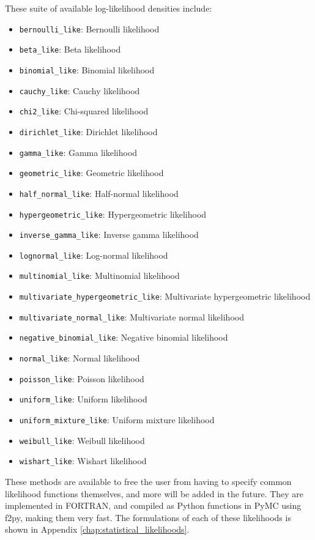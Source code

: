 \documentclass[]{book}
\begin{document}
These suite of available log-likelihood densities include:
\begin{itemize}

\item \verb=bernoulli_like=: Bernoulli likelihood
\item \verb=beta_like=: Beta likelihood
\item \verb=binomial_like=: Binomial likelihood
\item \verb=cauchy_like=: Cauchy likelihood
\item \verb=chi2_like=: Chi-squared likelihood
\item \verb=dirichlet_like=: Dirichlet likelihood
\item \verb=gamma_like=: Gamma likelihood
\item \verb=geometric_like=: Geometric likelihood
\item \verb=half_normal_like=: Half-normal likelihood
\item \verb=hypergeometric_like=: Hypergeometric likelihood
\item \verb=inverse_gamma_like=: Inverse gamma likelihood
\item \verb=lognormal_like=: Log-normal likelihood
\item \verb=multinomial_like=: Multinomial likelihood
\item \verb=multivariate_hypergeometric_like=: Multivariate hypergeometric likelihood
\item \verb=multivariate_normal_like=: Multivariate normal likelihood
\item \verb=negative_binomial_like=: Negative binomial likelihood
\item \verb=normal_like=: Normal likelihood
\item \verb=poisson_like=: Poisson likelihood
\item \verb=uniform_like=: Uniform likelihood
\item \verb=uniform_mixture_like=: Uniform mixture likelihood
\item \verb=weibull_like=: Weibull likelihood
\item \verb=wishart_like=: Wishart likelihood
\end{itemize}
These methods are available to free the user from having to specify common likelihood functions themselves, and more will be added in the future. They are implemented in FORTRAN, and compiled as Python functions in PyMC using f2py, making them very fast. The formulations of each of these likelihoods is shown in Appendix \ref{chap:statistical_likelihoods}.
\end{document}

